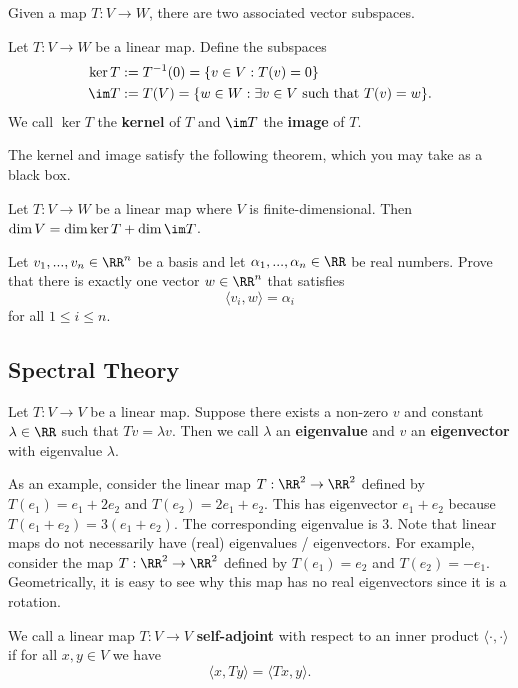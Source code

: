 \documentclass[11pt]{article}
\begin{document}
Given a map $T : V \to W$, there are two associated vector subspaces. 
\begin{defn}
    Let $T : V \to W$ be a linear map. Define the subspaces 
    \begin{align*}
        \ker T & := T^{-1}(0) = \{v \in V : T(v) = 0\} \\
        \im T & := T(V) = \{w \in W : \exists v \in V \text{ such that } T(v) = w\}.
    \end{align*}
    We call $\ker T$ the \textbf{kernel} of $T$ and $\im T$ the \textbf{image} of $T$. 
\end{defn}

The kernel and image satisfy the following theorem, which you may take as a black box. 
\begin{thm}
    Let $T : V \to W$ be a linear map where $V$ is finite-dimensional. Then $\dim V = \dim \ker T + \dim \im T$. 
\end{thm}

\begin{prob} [10 points]
    Let $v_1, ..., v_n \in \RR^n$ be a basis and let $\alpha_1, ..., \alpha_n \in \RR$ be real numbers. Prove that there is exactly one vector $w \in \RR^n$ that satisfies 
    \[
        \langle v_i, w \rangle = \alpha_i    
    \]
    for all $1 \leq i \leq n$. 
\end{prob}
\subsection{Spectral Theory}
\begin{defn}
    Let $T : V \to V$ be a linear map. Suppose there exists a non-zero $v$ and constant $\lambda \in \RR$ such that $Tv = \lambda v$. Then we call $\lambda$ an \textbf{eigenvalue} and $v$ an \textbf{eigenvector} with eigenvalue $\lambda$. 
\end{defn}

As an example, consider the linear map $T : \RR^2 \to \RR^2$ defined by $T(e_1) = e_1 + 2e_2$ and $T(e_2) = 2e_1 + e_2$. This has eigenvector $e_1 + e_2$ because $T(e_1 + e_2) = 3 (e_1 + e_2)$. The corresponding eigenvalue is $3$. Note that linear maps do not necessarily have (real) eigenvalues / eigenvectors. For example, consider the map $T : \RR^2 \to \RR^2$ defined by $T(e_1) = e_2$ and $T(e_2) = -e_1$. Geometrically, it is easy to see why this map has no real eigenvectors since it is a rotation. 

\begin{defn}
    We call a linear map $T : V \to V$ \textbf{self-adjoint} with respect to an inner product $\langle \cdot, \cdot \rangle$ if for all $x, y \in V$ we have 
    \[
        \langle x, Ty \rangle = \langle Tx, y \rangle.     
    \]
\end{defn}
\end{document}
